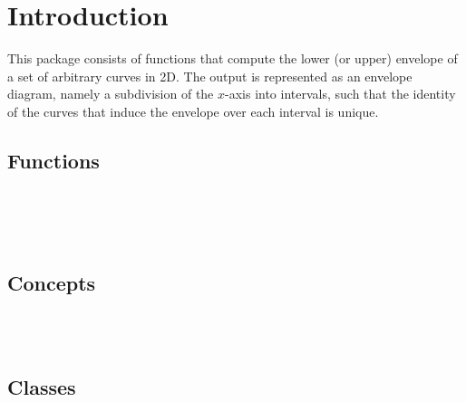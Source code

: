 \clearpage
{}


\section*{Introduction}
\label{env2_ref_sec:intro}

This package consists of functions that compute the lower (or upper)
envelope of a set of arbitrary curves in 2D. The output is
represented as an envelope diagram, namely a subdivision of the
$x$-axis into intervals, such that the identity of the curves that
induce the envelope over each interval is unique.

\subsection*{Functions}

\\
\\
\\

\subsection*{Concepts}

\\
\\

\subsection*{Classes}



